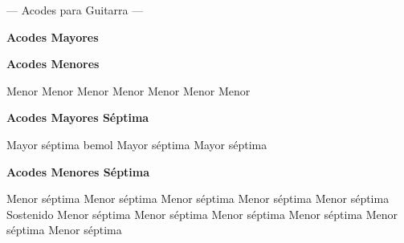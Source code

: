 %

\ifguitarra

\chead{\CHeadFont ({\rm\thepage})}
\rhead{\RHeadFont\RelDate}
{\parindent 8pt
        {\myTitleFont --- Acodes para Guitarra ---}}\par
\vskip 20pt
\textbf{Acodes Mayores}

\small
{}      

      
\normalsize

\textbf{Acodes Menores}

\small
{} Menor  Menor  Menor  Menor  Menor  Menor  Menor

      
\normalsize

\vskip 20pt
\textbf{Acodes Mayores S\'eptima}

 Mayor s\'eptima
 bemol Mayor s\'eptima
 Mayor s\'eptima
\vskip 20pt

\textbf{Acodes Menores S\'eptima}

\small
{} Menor s\'eptima
 Menor s\'eptima
 Menor s\'eptima
 Menor s\'eptima
 Menor s\'eptima
 Sostenido Menor s\'eptima
 Menor s\'eptima
 Menor s\'eptima
 Menor s\'eptima
 Menor s\'eptima
 Menor s\'eptima
\normalsize
\vskip 20pt

